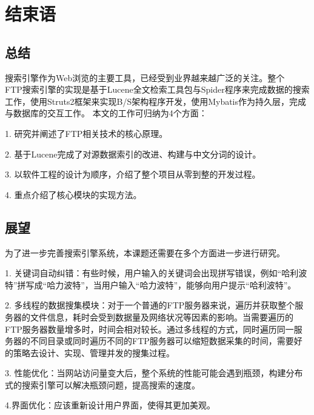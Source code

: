 \chapter{结束语}
\section{总结}
搜索引擎作为Web浏览的主要工具，已经受到业界越来越广泛的关注。整个\\FTP搜索引擎的实现是基于Lucene全文检索工具包与Spider程序来完成数据的搜索工作，使用Struts2框架来实现B/S架构程序开发，使用Mybatis作为持久层，完成与数据库的交互工作。
本文的工作可归纳为4个方面：

1.	研究并阐述了FTP相关技术的核心原理。

2.	基于Lucene完成了对源数据索引的改进、构建与中文分词的设计。

3.  以软件工程的设计为顺序，介绍了整个项目从零到整的开发过程。

4.  重点介绍了核心模块的实现方法。

\section{展望}
为了进一步完善搜索引擎系统，本课题还需要在多个方面进一步进行研究。

1. 关键词自动纠错：有些时候，用户输入的关键词会出现拼写错误，例如“哈利波特”拼写成“哈力波特”，当用户输入“哈力波特”，能够向用户提示“哈利波特”。

2. 多线程的数据搜集模块：对于一个普通的FTP服务器来说，遍历并获取整个服务器的文件信息，耗时会受到数据量及网络状况等因素的影响。当需要遍历的FTP服务器数量增多时，时间会相对较长。通过多线程的方式，同时遍历同一服务器的不同目录或同时遍历不同的FTP服务器可以缩短数据采集的时间，需要好的策略去设计、实现、管理并发的搜集过程。

3. 性能优化：当网站访问量变大后，整个系统的性能可能会遇到瓶颈，构建分布式的搜索引擎可以解决瓶颈问题，提高搜索的速度。

4.界面优化：应该重新设计用户界面，使得其更加美观。